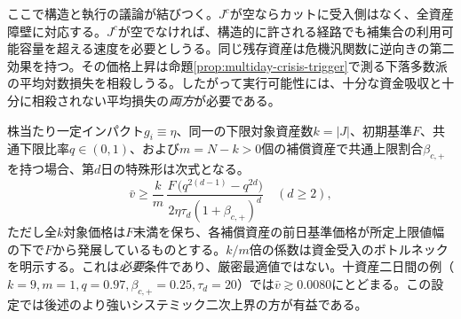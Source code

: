 \documentclass[11pt]{article}
\numberwithin{equation}{section}
\theoremstyle{definition}
\theoremstyle{remark}
\begin{document}
ここで構造と執行の議論が結びつく。$J^c$が空ならカットに受入側はなく、全資産障壁に対応する。$J^c$が空でなければ、構造的に許される経路でも補集合の利用可能容量を超える速度を必要としうる。同じ残存資産は危機汎関数に逆向きの第二効果を持つ。その価格上昇は命題\ref{prop:multiday-crisis-trigger}で測る下落多数派の平均対数損失を相殺しうる。したがって実行可能性には、十分な資金吸収と十分に相殺されない平均損失の\emph{両方}が必要である。

株当たり一定インパクト$g_i\equiv\eta$、同一の下限対象資産数$k=|J|$、初期基準$F$、共通下限比率$q\in(0,1)$、および$m=N-k>0$個の補償資産で共通上限割合$\beta_{c,+}$を持つ場合、第$d$日の特殊形は次式となる。
\begin{equation}\label{eq:cut-special}
\boxed{\bar v\ge \frac{k}{m}\,
\frac{F\,\big(q^{2(d-1)}-q^{2d}\big)}{2\eta\tau_d(1+\beta_{c,+})^{d}}\quad(d\ge2),}
\end{equation}
ただし全$k$対象価格は$F$未満を保ち、各補償資産の前日基準価格が所定上限値幅の下で$F$から発展しているものとする。$k/m$倍の係数は資金受入のボトルネックを明示する。これは\emph{必要}条件であり、厳密最適値ではない。十資産二日間の例（$k=9,m=1,q=0.97,\beta_{c,+}=0.25,\tau_d=20$）では$\bar v\gtrsim 0.0080$にとどまる。この設定では後述のより強いシステミック二次上界の方が有益である。
\end{document}
